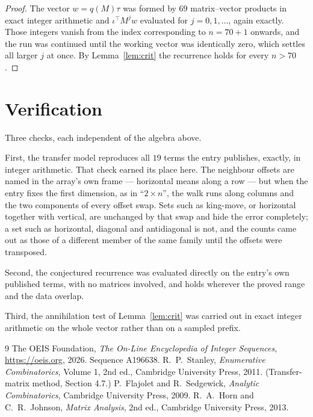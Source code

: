 \documentclass[11pt,a4paper]{article}
\theoremstyle{plain}
\theoremstyle{definition}
\begin{document}
\begin{proof}
The vector $w=q(M)\tau$ was formed by $69$ matrix--vector products in exact integer
arithmetic and $\iota^{\!\top}M^{j}w$ evaluated for $j=0,1,\dots$, again exactly. Those
integers vanish from the index corresponding to $n=70+1$ onwards, and the run was
continued until the working vector was identically zero, which settles all larger $j$ at once.
By Lemma~\ref{lem:crit} the recurrence holds for every $n>70$.
\end{proof}

\section{Verification}

Three checks, each independent of the algebra above.

First, the transfer model reproduces all $19$ terms the entry publishes, exactly, in
integer arithmetic. That check earned its place here. The neighbour offsets are named in the
array's own frame --- horizontal means along a row --- but when the entry fixes the first
dimension, as in ``$2\times n$'', the walk runs along columns and the two components of every
offset swap. Sets such as king-move, or horizontal together with vertical, are unchanged by
that swap and hide the error completely; a set such as horizontal, diagonal and antidiagonal
is not, and the counts came out as those of a different member of the same family until the
offsets were transposed.

Second, the conjectured recurrence was evaluated directly on the entry's own published terms,
with no matrices involved, and holds wherever the proved range and the data overlap.

Third, the annihilation test of Lemma~\ref{lem:crit} was carried out in exact integer
arithmetic on the whole vector rather than on a sampled prefix.

\begin{thebibliography}{9}
 The OEIS Foundation, \emph{The On-Line Encyclopedia of Integer
Sequences}, \url{https://oeis.org}, 2026. Sequence A196638.
 R.~P.~Stanley, \emph{Enumerative Combinatorics}, Volume 1, 2nd ed.,
Cambridge University Press, 2011. (Transfer-matrix method, Section 4.7.)
 P.~Flajolet and R.~Sedgewick, \emph{Analytic Combinatorics}, Cambridge
University Press, 2009.
 R.~A.~Horn and C.~R.~Johnson, \emph{Matrix Analysis}, 2nd ed., Cambridge
University Press, 2013.
\end{thebibliography}
\end{document}
